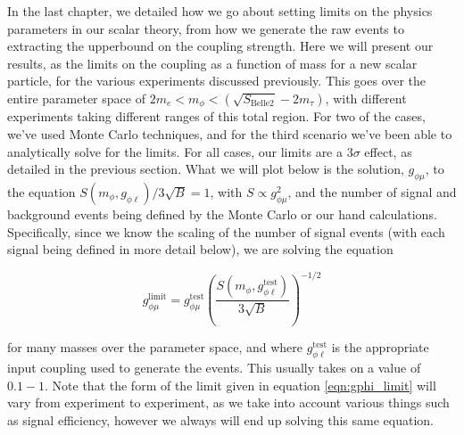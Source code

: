 \label{chapter:results}

In the last chapter, we detailed how we go about setting limits on the physics parameters in our scalar theory, from how we generate the raw events to extracting the upperbound on the coupling strength.
Here we will present our results, as the limits on the coupling as a function of mass for a new scalar particle, for the various experiments discussed previously.
This goes over the entire parameter space of $2m_e < m_\phi < (\sqrt{S_\textrm{Belle2}} - 2m_\tau)$, with different experiments taking different ranges of this total region.
For two of the cases, we've used \madgraph Monte Carlo techniques, and for the third scenario we've been able to analytically solve for the limits.
For all cases, our limits are a $3\sigma$ effect, as detailed in the previous section.
What we will plot below is the solution, $g_{\phi\mu}$, to the equation $S(m_\phi,g_{\phi\ell})/3\sqrt{B} = 1$, with $S \propto g_{\phi\mu}^2$, and the number of signal and background events being defined by the Monte Carlo or our hand calculations.
Specifically, since we know the scaling of the number of signal events (with each signal being defined in more detail below), we are solving the equation

\begin{equation}
\label{eqn:gphi_limit}
g_{\phi\mu}^\textrm{limit} = g_{\phi\mu}^\textrm{test} \left( \frac{S(m_\phi,g_{\phi\ell}^\textrm{test})}{3\sqrt{B}} \right)^{-1/2}
\end{equation}

\noindent for many masses over the parameter space, and where $g_{\phi\ell}^\textrm{test}$ is the appropriate input coupling used to generate the events.
This usually takes on a value of $0.1 - 1$.
Note that the form of the limit given in equation \ref{eqn:gphi_limit} will vary from experiment to experiment, as we take into account various things such as signal efficiency, however we always will end up solving this same equation.




